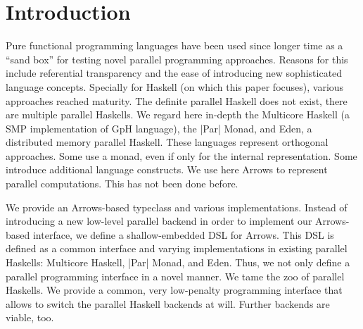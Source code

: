
\section{Introduction}
\label{sec:introduction}
%
%
%

Pure functional programming languages have been used
since longer time as a ``sand box'' for testing novel parallel
programming approaches. Reasons for this include referential
transparency and the ease of introducing new sophisticated language
concepts. Specially for Haskell (on which this paper focuses), various
approaches reached maturity. The definite parallel Haskell does not
exist, there are multiple parallel Haskells. We regard here in-depth
the Multicore Haskell (a SMP implementation of GpH language), the
|Par| Monad, and Eden, a distributed memory parallel Haskell. These
languages represent orthogonal approaches. Some use a monad, even if
only for the internal representation. Some introduce additional
language constructs. 
We use here Arrows to represent parallel computations. This has not
been done before.

We provide an Arrows-based typeclass and various implementations.
Instead of 
introducing a new low-level parallel backend in order to implement our
Arrows-based interface, we define a shallow-embedded DSL for Arrows. This DSL
is defined as a common interface and varying implementations in
existing parallel Haskells: Multicore Haskell, |Par| Monad, and
Eden. Thus, we not only define a parallel programming interface in a
novel manner. We tame the zoo of parallel Haskells. We provide a
common, very low-penalty programming interface that allows to switch
the parallel Haskell backends at will. Further backends are viable, too.

